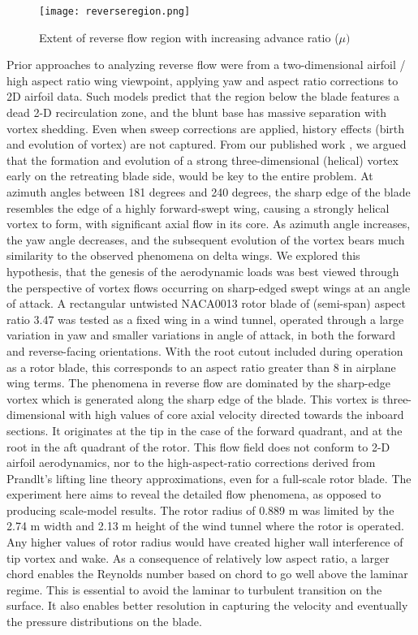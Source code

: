 \documentclass[%
 reprint,
 showkeys,
 amsmath,amssymb,
 aps,
]{revtex4-1}
\begin{document}
\begin{figure}[!t]
\centering
\texttt{[image: reverseregion.png]}
\caption{Extent of reverse flow region with increasing advance ratio ($\mu)$}
\label{reverseregion}
\end{figure}

Prior approaches to analyzing reverse flow were from a two-dimensional airfoil / high aspect ratio wing viewpoint, applying yaw and aspect ratio corrections to 2D airfoil data. Such models predict that the region below the blade features a dead 2-D recirculation zone, and the blunt base has massive separation with vortex shedding. Even when sweep corrections are applied, history effects (birth and evolution of vortex) are not captured. From our published work \cite{44ShuklaASME2015, 2HiremathAHS-2015}, we argued that the formation and evolution of a strong three-dimensional (helical) vortex early on the retreating blade side, would be key to the entire problem. At azimuth angles between 181 degrees and 240 degrees, the sharp edge of the blade resembles the edge of a highly forward-swept wing, causing a strongly helical vortex to form, with significant axial flow in its core. As azimuth angle increases, the yaw angle decreases, and the subsequent evolution of the vortex bears much similarity to the observed phenomena on delta wings. We explored this hypothesis, that the genesis of the aerodynamic loads was best viewed through the perspective of vortex flows occurring on sharp-edged swept wings at an angle of attack. A rectangular untwisted NACA0013 rotor blade of (semi-span) aspect ratio 3.47 was tested as a fixed wing in a wind tunnel, operated through a large variation in yaw and smaller variations in angle of attack, in both the forward and reverse-facing orientations. With the root cutout included during operation as a rotor blade, this corresponds to an aspect ratio greater than 8 in airplane wing terms. The phenomena in reverse flow are dominated by the sharp-edge vortex which is generated along the sharp edge of the blade. This vortex is three-dimensional with high values of core axial velocity directed towards the inboard sections. It originates at the tip in the case of the forward quadrant, and at the root in the aft quadrant of the rotor. This flow field does not conform to 2-D airfoil aerodynamics, nor to the high-aspect-ratio corrections derived from Prandlt’s lifting line theory approximations, even for a full-scale rotor blade. The experiment here aims to reveal the detailed flow phenomena, as opposed to producing scale-model results. The rotor radius of 0.889 m was limited by the 2.74 m width and 2.13 m height of the wind tunnel where the rotor is operated. Any higher values of rotor radius would have created higher wall interference of tip vortex and wake. As a consequence of relatively low aspect ratio, a larger chord enables the Reynolds number based on chord to go well above the laminar regime. This is essential to avoid the laminar to turbulent transition on the surface. It also enables better resolution in capturing the velocity and eventually the pressure distributions on the blade.
\end{document}
